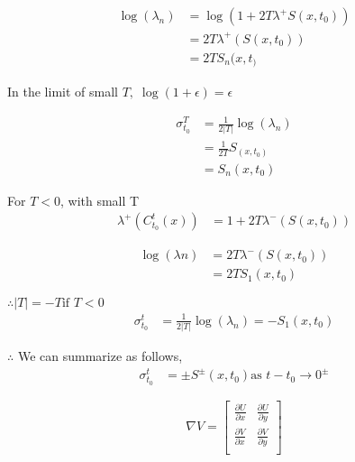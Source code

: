\documentclass[../report.tex]{subfiles}
\begin{document}
\begin{equation}
  \begin{aligned}
    \log(\lambda_n) &= \log(1 + 2T\lambda^+S(x, t_0)) \\
    &= 2T\lambda^+(S(x, t_0)) \\
    &= 2TS_n(x, t_)
  \end{aligned}
\end{equation}

In the limit of small \(T,\; \log(1+\epsilon) = \epsilon\)

\begin{equation}
  \begin{aligned}
    \sigma_{t_0}^T &= \frac{1}{2|T|}\log(\lambda_n) \\
    &= \frac{1}{2T} S_(x, t_0) \\
    &= S_n(x, t_0)
  \end{aligned}
\end{equation}

For \(T < 0\), with small T
\begin{equation}
  \begin{aligned}
    \lambda^+ (C_{t_0}^t(x)) &= 1 + 2T \lambda^- (S(x, t_0))
  \end{aligned}
\end{equation}

\begin{equation}
  \begin{aligned}
    \log(\lambda n) &= 2T\lambda^- (S(x, t_0)) \\
    &= 2TS_1(x, t_0)
  \end{aligned}
\end{equation}

\(\therefore |T| = -T \text{if } T < 0\)
\begin{equation}
  \begin{aligned}
    \sigma_{t_0}^t &= \frac{1}{2|T|} \log(\lambda_n) = -S_1(x, t_0)
  \end{aligned}
\end{equation}

\(\therefore\) We can summarize as follows,
\begin{equation}
  \begin{aligned}
    \sigma_{t_0}^t &= \pm S^\pm (x, t_0) \text{as } t - t_0 \rightarrow 0^\pm
  \end{aligned}
\end{equation}

\begin{equation}
  \nabla V = \begin{bmatrix}
    \frac{\partial U}{\partial x} & \frac{\partial U}{\partial y} \\[12pt]
    \frac{\partial V}{\partial x} & \frac{\partial V}{\partial y} \\
  \end{bmatrix}
\end{equation}
\end{document}
